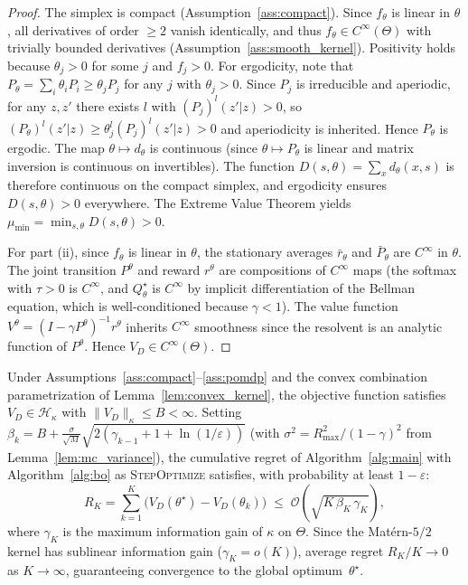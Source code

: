 \documentclass[12pt]{article}
\renewcommand{\[}{\left[}
\renewcommand{\]}{\right]}
\renewcommand{\(}{\left(}
\renewcommand{\)}{\right)}
\newcounter{l1}
\newcounter{l2}
\newcounter{l3}
\newcommand{\Rmax}{R_{\max}}
\begin{document}
\begin{proof}
The simplex is compact (Assumption~\ref{ass:compact}). Since $f_\theta$ is linear in
$\theta$, all derivatives of order $\ge 2$ vanish identically, and thus $f_\theta \in
C^\infty(\Theta)$ with trivially bounded derivatives (Assumption~\ref{ass:smooth_kernel}).
Positivity holds because $\theta_j > 0$ for some $j$ and $f_j > 0$. For ergodicity, note that $P_\theta = \sum_i \theta_i P_i \ge \theta_j P_j$ for any $j$ with
$\theta_j > 0$. Since $P_j$ is irreducible and aperiodic, for any $z, z'$ there exists
$l$ with $(P_j)^l(z'|z)>0$, so $(P_\theta)^l(z'|z) \ge \theta_j^l(P_j)^l(z'|z)>0$
and aperiodicity is inherited. Hence $P_\theta$ is ergodic. The map $\theta\mapsto d_\theta$ is continuous (since $\theta\mapsto P_\theta$ is
linear and matrix inversion is continuous on invertibles). The function
$D(s,\theta)=\sum_x d_\theta(x,s)$ is therefore continuous on the compact simplex, and
ergodicity ensures $D(s,\theta)>0$ everywhere. The Extreme Value Theorem yields
$\mu_{\min} = \min_{s,\theta}D(s,\theta) > 0$.

For part (ii), since $f_\theta$ is linear in $\theta$, the stationary averages
$\bar{r}_\theta$ and $\bar{P}_\theta$ are $C^\infty$ in $\theta$. The joint transition
$P^\theta$ and reward $r^\theta$ are compositions of $C^\infty$ maps (the softmax with
$\tau>0$ is $C^\infty$, and $Q^\star_\theta$ is $C^\infty$ by implicit differentiation
of the Bellman equation, which is well-conditioned because $\gamma < 1$). The value
function $V^\theta = (I-\gamma P^\theta)^{-1}r^\theta$ inherits $C^\infty$ smoothness
since the resolvent is an analytic function of $P^\theta$. Hence $V_D\in C^\infty(\Theta)$.
\end{proof}

\begin{theorem}
\label{thm:bo_convergence}
Under Assumptions~\ref{ass:compact}--\ref{ass:pomdp} and the convex combination
parametrization of Lemma~\ref{lem:convex_kernel}, the objective function satisfies
$V_D \in \mathcal{H}_\kappa$ with $\|V_D\|_\kappa \le B < \infty$.
Setting
$\beta_k = B + \frac{\sigma}{\sqrt{M}}\sqrt{2(\gamma_{k-1}+1+\ln(1/\varepsilon))}$
(with $\sigma^2 = \Rmax^2/(1-\gamma)^2$ from Lemma~\ref{lem:mc_variance}), the
cumulative regret of Algorithm~\ref{alg:main} with Algorithm~\ref{alg:bo} as
\textsc{StepOptimize} satisfies, with probability at least $1-\varepsilon$:
\begin{equation*}
  R_K = \sum_{k=1}^K \bigl(V_D(\theta^\star) - V_D(\theta_k)\bigr)
  \;\le\; \mathcal{O}\!\left(\sqrt{K\,\beta_K\,\gamma_K}\right),
\end{equation*}
where $\gamma_K$ is the maximum information gain of $\kappa$ on $\Theta$.
Since the Mat\'{e}rn-$5/2$ kernel has sublinear information gain ($\gamma_K = o(K)$),
average regret $R_K/K \to 0$ as $K\to\infty$, guaranteeing convergence to the global
optimum~$\theta^\star$.
\end{theorem}
\end{document}

